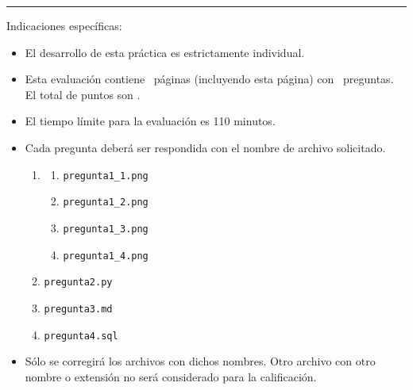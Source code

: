 \documentclass[12pt]{exam}
\newcommand{\timelimit}{110 minutos}
\begin{document}
\rule[2ex]{\textwidth}{2pt}
\Large Indicaciones específicas:
\normalsize
\begin{itemize}
  \item El desarrollo de esta práctica es estrictamente individual.
  \item Esta evaluación contiene \numpages\ páginas (incluyendo esta página) con \numquestions\ preguntas. El total de puntos son \numpoints.
  \item El tiempo límite para la evaluación es \timelimit.
  \item Cada pregunta deberá ser respondida con el nombre de archivo solicitado.
  \begin{enumerate}
    \item\begin{enumerate}
      \item \texttt{pregunta1\_1.png}
      \item \texttt{pregunta1\_2.png}
      \item \texttt{pregunta1\_3.png}
      \item \texttt{pregunta1\_4.png}
    \end{enumerate}
    
    \item \texttt{pregunta2.py}
    \item \texttt{pregunta3.md}
    \item \texttt{pregunta4.sql}
  
  \end{enumerate}

  \item Sólo se corregirá los archivos con dichos nombres. Otro archivo con otro nombre o extensión no será considerado para la calificación.
\end{itemize}


\end{document}
